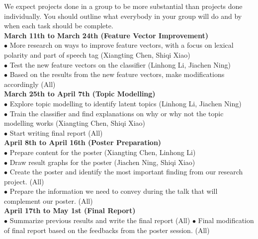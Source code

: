 \documentclass{article}
\begin{document}
 We expect projects done in a group to be more substantial than projects done individually. You should outline what everybody in your group will do and by when each task should be complete.\\
\noindent \textbf{March 11th to March 24th (Feature Vector Improvement)} \\
$\bullet$ More research on ways to improve feature vectors, with a focus on lexical polarity and part of speech tag (Xiangting Chen, Shiqi Xiao) \\
$\bullet$ Test the new feature vectors on the classifier (Linhong Li, Jiachen Ning)\\
$\bullet$  Based on the results from the new feature vectors, make modifications accordingly (All)\\
\textbf{March 25th to April 7th (Topic Modelling)}\\
$\bullet$  Explore topic modelling to identify latent topics (Linhong Li, Jiachen Ning)\\
$\bullet$  Train the classifier and find explanations on why or why not the topic modelling works (Xiangting Chen, Shiqi Xiao) \\
$\bullet$  Start writing final report (All)\\
\textbf{April 8th to April 16th (Poster Preparation)}\\
$\bullet$  Prepare content for the poster (Xiangting Chen, Linhong Li) \\
$\bullet$ Draw result graphs for the poster (Jiachen Ning, Shiqi Xiao) \\
$\bullet$  Create the poster and identify the most important finding from our research project. (All) \\
$\bullet$ Prepare the information we need to convey during the talk that will complement our poster. (All)\\
\textbf{April 17th to May 1st (Final Report)}\\
$\bullet$  Summarize previous results and write the final report (All) 
$\bullet$ Final modification of final report based on the feedbacks from the poster session. (All)
\end{document}
